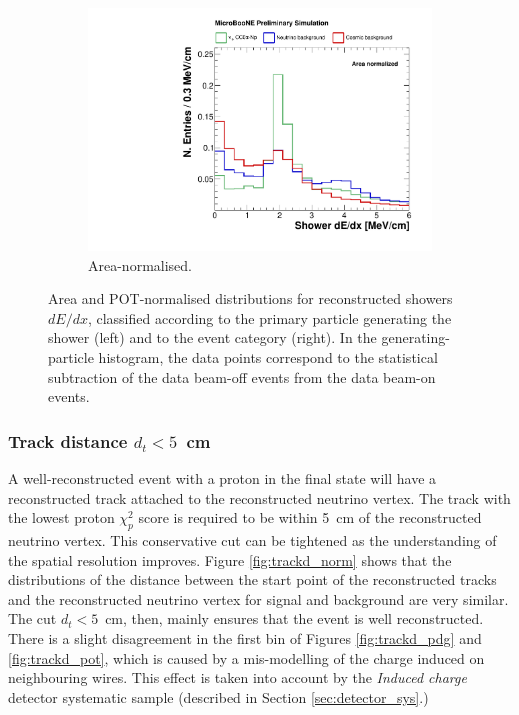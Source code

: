\begin{figure}[htbp]
\begin{subfigure}{0.49\textwidth}
    \includegraphics[width=\linewidth]{figures/h_shower_dedx_cali_norm.pdf}
    \caption{Area-normalised.} \label{fig:dedx_norm}
  \end{subfigure}
  \caption{Area and POT-normalised distributions for reconstructed showers $dE/dx$, classified according to the primary particle generating the shower (left) and to the event category (right). In the generating-particle histogram, the data points correspond to the statistical subtraction of the data beam-off events from the data beam-on events.}\label{fig:dedx_datamc}
\end{figure}

\subsubsection*{Track distance $d_{t} < 5$~cm}
A well-reconstructed event with a proton in the final state will have a reconstructed track attached to the reconstructed neutrino vertex. The track with the lowest proton $\chi_{p}^2$ score is required to be within 5~cm of the reconstructed neutrino vertex. This conservative cut can be tightened as the understanding of the spatial resolution improves. 
Figure \ref{fig:trackd_norm} shows that the distributions of the distance between the start point of the reconstructed tracks and the reconstructed neutrino vertex for signal and background are very similar. The cut $d_{t} < 5$~cm, then, mainly ensures that the event is well reconstructed. There is a slight disagreement in the first bin of Figures \ref{fig:trackd_pdg} and \ref{fig:trackd_pot}, which is caused by a mis-modelling of the charge induced on neighbouring wires. This effect is taken into account by the \emph{Induced charge} detector systematic sample (described in Section \ref{sec:detector_sys}.)

